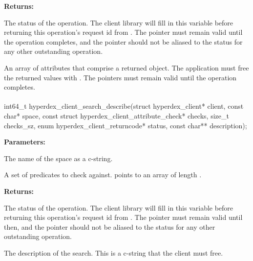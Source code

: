 \noindent\textbf{Returns:}
\begin{description}[labelindent=\widthof{{\code{attrs}, \code{attrs\_sz}}},leftmargin=*,noitemsep,nolistsep,align=right]
\item[\code{status}] The status of the operation.  The client library will fill in this variable before returning this operation's request id from .  The pointer must remain valid until the operation completes, and the pointer should not be aliased to the status for any other outstanding operation.
\item[\code{attrs}, \code{attrs\_sz}] An array of attributes that comprise a returned object.  The application must free the returned values with .  The pointers must remain valid until the operation completes.
\end{description}

\paragraph{}
\begin{ccode}
int64_t hyperdex_client_search_describe(struct hyperdex_client* client,
                const char* space,
                const struct hyperdex_client_attribute_check* checks, size_t checks_sz,
                enum hyperdex_client_returncode* status,
                const char** description);
\end{ccode}
\funcdesc 

\noindent\textbf{Parameters:}
\begin{description}[labelindent=\widthof{{\code{checks}, \code{checks\_sz}}},leftmargin=*,noitemsep,nolistsep,align=right]
\item[\code{space}] The name of the space as a c-string.
\item[\code{checks}, \code{checks\_sz}] A set of predicates to check against.   points to an array of length .
\end{description}

\noindent\textbf{Returns:}
\begin{description}[labelindent=\widthof{{\code{description}}},leftmargin=*,noitemsep,nolistsep,align=right]
\item[\code{status}] The status of the operation.  The client library will fill in this variable before returning this operation's request id from .  The pointer must remain valid until then, and the pointer should not be aliased to the status for any other outstanding operation.
\item[\code{description}] The description of the search.  This is a c-string that the client must free.
\end{description}

